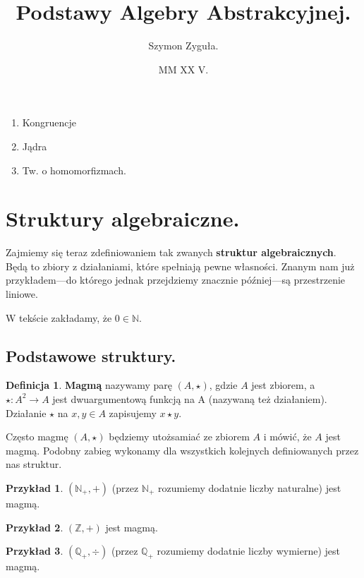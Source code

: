 \documentclass{article}
\date{MM XX V.}
\author{Szymon Zyguła.}
\title{Podstawy Algebry Abstrakcyjnej.}
\theoremstyle{definition}
\newtheorem{definition}{Definicja}[section]
\newtheorem{example}{Przykład}[section]
\begin{document}
\maketitle

\begin{enumerate}
	\item Kongruencje
	\item Jądra
	\item Tw. o homomorfizmach.
\end{enumerate}

\section{Struktury algebraiczne.}

Zajmiemy się teraz zdefiniowaniem tak zwanych \textbf{struktur algebraicznych}.
Będą to zbiory z działaniami, które spełniają pewne własności.
Znanym nam już przykładem{\mbox{---}}do którego jednak przejdziemy znacznie później---są przestrzenie liniowe.

W tekście zakładamy, że $0 \in \mathbb{N}$.

\subsection{Podstawowe struktury.}

\begin{definition}
	\textbf{Magmą} nazywamy parę $(A, \star)$, gdzie $A$ jest zbiorem, a $\star: A^2 \to A$ jest dwuargumentową funkcją na A (nazywaną też działaniem). Działanie $\star$ na $x, y \in A$ zapisujemy $x \star y$.
\end{definition}
Często magmę $(A, \star)$ będziemy utożsamiać ze zbiorem $A$ i mówić, że $A$ jest magmą.
Podobny zabieg wykonamy dla wszystkich kolejnych definiowanych przez nas struktur.

\begin{example}
	$(\mathbb{N}_+, +)$ (przez $\mathbb{N}_+$ rozumiemy dodatnie liczby naturalne) jest magmą.
\end{example}

\begin{example}
	$(\mathbb{Z}, +)$ jest magmą.
\end{example}

\begin{example}
	$(\mathbb{Q}_+, \div)$ (przez $\mathbb{Q}_+$ rozumiemy dodatnie liczby wymierne) jest magmą.
\end{example}
\end{document}
